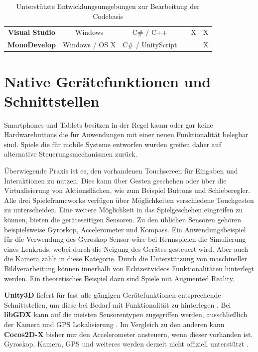 \begin{table}[htbp]
{\begin{tabular}{cccccc}
			\rowcolor[HTML]{C0C0C0} 
			\textbf{Visual Studio}                         & Windows                                        & C\# / C++                                          &                                        & X                                         & X                                       \\
			\textbf{MonoDevelop}                           & Windows / OS X                                 & C\# / UnityScript                                  &                                        &                                           & X                                      
		\end{tabular}
	}
	\caption{Unterstützte Entwicklungsumgebungen zur Bearbeitung der Codebasis} \citep{libGDX_wiki, cocos2d_main_features, unity_code_editor}
	\label{ides}
\end{table}

\section{Native Gerätefunktionen und Schnittstellen}
Smartphones und Tablets besitzen in der Regel kaum oder gar keine Hardwarebuttons die für Anwendungen mit einer neuen Funktionalität belegbar sind. Spiele die für mobile Systeme entworfen wurden greifen daher auf alternative Steuerungsmechanismen zurück.

\bigskip
Überwiegende Praxis ist es, den vorhandenen Touchscreen für Eingaben und Interaktionen zu nutzen. Dies kann über Gesten geschehen oder über die Virtualisierung von Aktionsflächen, wie zum Beispiel Buttons und Schieberegler. Alle drei Spieleframeworks verfügen über Möglichkeiten verschiedene Touchgesten zu unterscheiden.
Eine weitere Möglichkeit in das Spielgeschehen eingreifen zu können, bieten die geräteseitigen Sensoren. Zu den üblichen Sensoren gehören beispielsweise Gyroskop, Accelerometer und Kompass. Ein Anwendungsbeispiel für die Verwendung des Gyroskop Sensor wäre bei Rennspielen die Simulierung eines Lenkrads, wobei durch die Neigung des Gerätes gesteuert wird. Aber auch die Kamera zählt in diese Kategorie. Durch die Unterstützung von maschineller Bildverarbeitung können innerhalb von Echtzeitvideos Funktionalitäten hinterlegt werden. Ein theoretisches Beispiel dazu sind Spiele mit Augmented Reality.

\bigskip
\textbf{Unity3D} liefert für fast alle gängigen Gerätefunktionen entsprechende Schnittstellen, um diese bei Bedarf mit Funktionalität zu hinterlegen \citep{unity_docs}. Bei \textbf{libGDX} kann auf die meisten Sensorentypen zugegriffen werden, ausschließlich der Kamera und GPS Lokalisierung \citep{libGDX_docs}. Im Vergleich zu den anderen kann \textbf{Cocos2D-X} bisher nur den Accelerometer ansteuern, wenn dieser vorhanden ist. Gyroskop, Kamera, GPS und weiteres werden derzeit nicht offiziell unterstützt \citep{cocos2d_docs}. 

